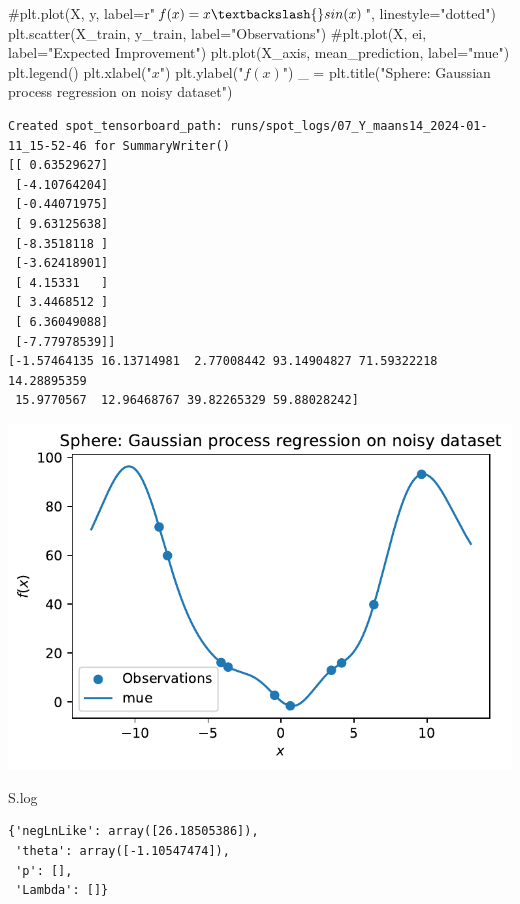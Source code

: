 \documentclass[
  letterpaper,
  DIV=11,
  numbers=noendperiod]{scrreprt}
\newenvironment{Shaded}{\begin{snugshade}}{\end{snugshade}}
\newcommand{\CommentTok}[1]{\textcolor[rgb]{0.37,0.37,0.37}{#1}}
\newcommand{\NormalTok}[1]{\textcolor[rgb]{0.00,0.23,0.31}{#1}}
\newcommand{\OperatorTok}[1]{\textcolor[rgb]{0.37,0.37,0.37}{#1}}
\newcommand{\StringTok}[1]{\textcolor[rgb]{0.13,0.47,0.30}{#1}}
\begin{document}
\begin{Shaded}
\begin{Highlighting}[]
\CommentTok{\#plt.plot(X, y, label=r"$f(x) = x \textbackslash{}sin(x)$", linestyle="dotted")}
\NormalTok{plt.scatter(X\_train, y\_train, label}\OperatorTok{=}\StringTok{"Observations"}\NormalTok{)}
\CommentTok{\#plt.plot(X, ei, label="Expected Improvement")}
\NormalTok{plt.plot(X\_axis, mean\_prediction, label}\OperatorTok{=}\StringTok{"mue"}\NormalTok{)}
\NormalTok{plt.legend()}
\NormalTok{plt.xlabel(}\StringTok{"$x$"}\NormalTok{)}
\NormalTok{plt.ylabel(}\StringTok{"$f(x)$"}\NormalTok{)}
\NormalTok{\_ }\OperatorTok{=}\NormalTok{ plt.title(}\StringTok{"Sphere: Gaussian process regression on noisy dataset"}\NormalTok{)}
\end{Highlighting}
\end{Shaded}

\begin{verbatim}
Created spot_tensorboard_path: runs/spot_logs/07_Y_maans14_2024-01-11_15-52-46 for SummaryWriter()
[[ 0.63529627]
 [-4.10764204]
 [-0.44071975]
 [ 9.63125638]
 [-8.3518118 ]
 [-3.62418901]
 [ 4.15331   ]
 [ 3.4468512 ]
 [ 6.36049088]
 [-7.77978539]]
[-1.57464135 16.13714981  2.77008442 93.14904827 71.59322218 14.28895359
 15.9770567  12.96468767 39.82265329 59.88028242]
\end{verbatim}

\includegraphics{012_num_spot_ei_files/figure-pdf/cell-49-output-2.pdf}

\begin{Shaded}
\begin{Highlighting}[]
\NormalTok{S.log}
\end{Highlighting}
\end{Shaded}

\begin{verbatim}
{'negLnLike': array([26.18505386]),
 'theta': array([-1.10547474]),
 'p': [],
 'Lambda': []}
\end{verbatim}
\end{document}
